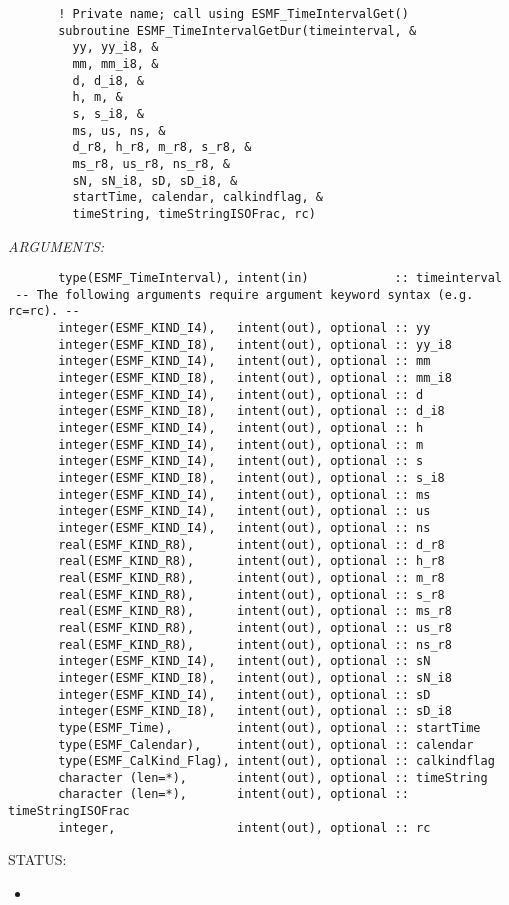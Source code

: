  
\begin{verbatim}       ! Private name; call using ESMF_TimeIntervalGet()
       subroutine ESMF_TimeIntervalGetDur(timeinterval, &
         yy, yy_i8, &
         mm, mm_i8, &
         d, d_i8, &
         h, m, &
         s, s_i8, &
         ms, us, ns, &
         d_r8, h_r8, m_r8, s_r8, &
         ms_r8, us_r8, ns_r8, &
         sN, sN_i8, sD, sD_i8, &
         startTime, calendar, calkindflag, &
         timeString, timeStringISOFrac, rc)
 \end{verbatim}{\em ARGUMENTS:}
\begin{verbatim}       type(ESMF_TimeInterval), intent(in)            :: timeinterval
 -- The following arguments require argument keyword syntax (e.g. rc=rc). --
       integer(ESMF_KIND_I4),   intent(out), optional :: yy
       integer(ESMF_KIND_I8),   intent(out), optional :: yy_i8
       integer(ESMF_KIND_I4),   intent(out), optional :: mm
       integer(ESMF_KIND_I8),   intent(out), optional :: mm_i8
       integer(ESMF_KIND_I4),   intent(out), optional :: d
       integer(ESMF_KIND_I8),   intent(out), optional :: d_i8
       integer(ESMF_KIND_I4),   intent(out), optional :: h
       integer(ESMF_KIND_I4),   intent(out), optional :: m
       integer(ESMF_KIND_I4),   intent(out), optional :: s
       integer(ESMF_KIND_I8),   intent(out), optional :: s_i8
       integer(ESMF_KIND_I4),   intent(out), optional :: ms
       integer(ESMF_KIND_I4),   intent(out), optional :: us
       integer(ESMF_KIND_I4),   intent(out), optional :: ns
       real(ESMF_KIND_R8),      intent(out), optional :: d_r8
       real(ESMF_KIND_R8),      intent(out), optional :: h_r8
       real(ESMF_KIND_R8),      intent(out), optional :: m_r8
       real(ESMF_KIND_R8),      intent(out), optional :: s_r8
       real(ESMF_KIND_R8),      intent(out), optional :: ms_r8
       real(ESMF_KIND_R8),      intent(out), optional :: us_r8
       real(ESMF_KIND_R8),      intent(out), optional :: ns_r8
       integer(ESMF_KIND_I4),   intent(out), optional :: sN
       integer(ESMF_KIND_I8),   intent(out), optional :: sN_i8
       integer(ESMF_KIND_I4),   intent(out), optional :: sD
       integer(ESMF_KIND_I8),   intent(out), optional :: sD_i8
       type(ESMF_Time),         intent(out), optional :: startTime
       type(ESMF_Calendar),     intent(out), optional :: calendar
       type(ESMF_CalKind_Flag), intent(out), optional :: calkindflag
       character (len=*),       intent(out), optional :: timeString
       character (len=*),       intent(out), optional :: timeStringISOFrac
       integer,                 intent(out), optional :: rc
 \end{verbatim}
{\sf STATUS:}
   \begin{itemize}
   \item{}
   \end{itemize}
  
